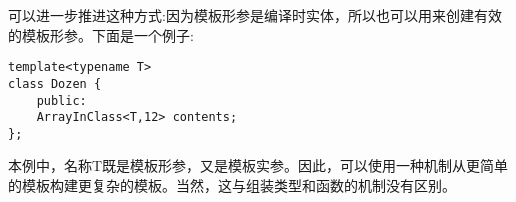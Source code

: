 可以进一步推进这种方式:因为模板形参是编译时实体，所以也可以用来创建有效的模板形参。下面是一个例子:

\begin{lstlisting}[style=styleCXX]
template<typename T>
class Dozen {
	public:
	ArrayInClass<T,12> contents;
};
\end{lstlisting}

本例中，名称T既是模板形参，又是模板实参。因此，可以使用一种机制从更简单的模板构建更复杂的模板。当然，这与组装类型和函数的机制没有区别。


























